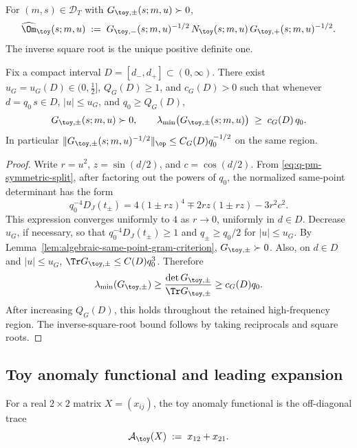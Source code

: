 \begin{definition}
\label{def:toy-whitened-block}
For \((m,s)\in\mathcal D_T\) with \(G_{\toy,\pm}(s;m,u)\succ 0\),
\begin{equation}
\label{eq:omega-toy}
\widehat\Om_\toy(s;m,u)
\;:=\;G_{\toy,-}(s;m,u)^{-1/2}\,N_\toy(s;m,u)\,G_{\toy,+}(s;m,u)^{-1/2}.
\end{equation}
The inverse square root is the unique positive definite one.
\end{definition}

\begin{lemma}
\label{lem:toy-block-positivity}
Fix a compact interval \(D=[d_-,d_+]\subset(0,\infty)\).  There exist
\(u_G=u_G(D)\in(0,\tfrac12]\), \(Q_G(D)\ge1\), and \(c_G(D)>0\) such
that whenever \(d=q_0\,s\in D\), \(|u|\le u_G\), and \(q_0\ge Q_G(D)\),
\[
        G_{\toy,\pm}(s;m,u)\succ 0,
        \qquad
        \lambda_{\min}\bigl(G_{\toy,\pm}(s;m,u)\bigr)\;\ge\;c_G(D)\,q_0.
\]
In particular \(\|G_{\toy,\pm}(s;m,u)^{-1/2}\|_{\op}\le C_G(D)q_0^{-1/2}\)
on the same region.
\end{lemma}

\begin{proof}
Write \(r=u^2\), \(z=\sin(d/2)\), and \(c=\cos(d/2)\).  From
\eqref{eq:q-pm-symmetric-split}, after factoring out the powers of
\(q_0\), the normalized same-point determinant has the form
\[
q_0^{-4}D_J(t_\pm)
=
4(1\pm rz)^4 \mp 2rz(1\pm rz)-3r^2c^2.
\]
This expression converges uniformly to \(4\) as \(r\to0\), uniformly in
\(d\in D\).  Decrease \(u_G\), if necessary, so that
\(q_0^{-4}D_J(t_\pm)\ge 1\) and \(q_\pm\ge q_0/2\) for
\(|u|\le u_G\).  By Lemma~\ref{lem:algebraic-same-point-gram-criterion},
\(G_{\toy,\pm}\succ0\).  Also, on \(d\in D\) and \(|u|\le u_G\),
\(\Tr G_{\toy,\pm}\le C(D)q_0^3\).  Therefore
\[
\lambda_{\min}(G_{\toy,\pm})
\ge \frac{\det G_{\toy,\pm}}{\Tr G_{\toy,\pm}}
\ge c_G(D)q_0.
\]
After increasing \(Q_G(D)\), this holds throughout the retained
high-frequency region.  The inverse-square-root bound follows by taking
reciprocals and square roots.
\end{proof}

\subsection{Toy anomaly functional and leading expansion}
\label{subsec:toy-anomaly-functional}

\begin{definition}
\label{def:toy-anomaly-functional}
For a real \(2\times 2\) matrix \(X=(x_{ij})\), the toy anomaly
functional is the off-diagonal trace
\begin{equation}
\label{eq:toy-anomaly-functional}
\mathcal A_\toy(X)\;:=\;x_{12}+x_{21}.
\end{equation}
\end{definition}

